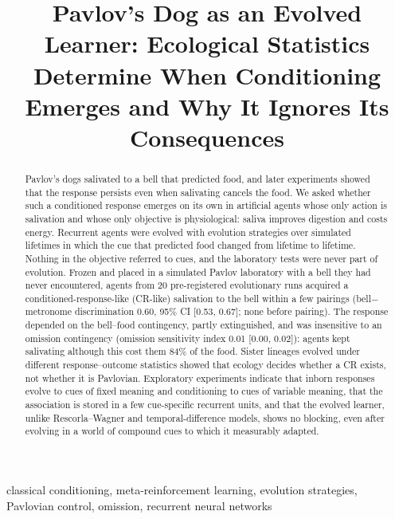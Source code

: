 \documentclass[conference]{IEEEtran}
\begin{document}
\title{Pavlov's Dog as an Evolved Learner: Ecological Statistics Determine When Conditioning Emerges and Why It Ignores Its Consequences}

\author{
}

\maketitle

\begin{abstract}
Pavlov's dogs salivated to a bell that predicted food, and later experiments showed that the response persists even when salivating cancels the food. We asked whether such a conditioned response emerges on its own in artificial agents whose only action is salivation and whose only objective is physiological: saliva improves digestion and costs energy. Recurrent agents were evolved with evolution strategies over simulated lifetimes in which the cue that predicted food changed from lifetime to lifetime. Nothing in the objective referred to cues, and the laboratory tests were never part of evolution. Frozen and placed in a simulated Pavlov laboratory with a bell they had never encountered, agents from 20 pre-registered evolutionary runs acquired a conditioned-response-like (CR-like) salivation to the bell within a few pairings (bell$-$metronome discrimination 0.60, 95\% CI [0.53, 0.67]; none before pairing). The response depended on the bell--food contingency, partly extinguished, and was insensitive to an omission contingency (omission sensitivity index 0.01 [0.00, 0.02]): agents kept salivating although this cost them 84\% of the food. Sister lineages evolved under different response--outcome statistics showed that ecology decides whether a CR exists, not whether it is Pavlovian. Exploratory experiments indicate that inborn responses evolve to cues of fixed meaning and conditioning to cues of variable meaning, that the association is stored in a few cue-specific recurrent units, and that the evolved learner, unlike Rescorla--Wagner and temporal-difference models, shows no blocking, even after evolving in a world of compound cues to which it measurably adapted.
\end{abstract}

\begin{IEEEkeywords}
classical conditioning, meta-reinforcement learning, evolution strategies, Pavlovian control, omission, recurrent neural networks
\end{IEEEkeywords}
\end{document}
